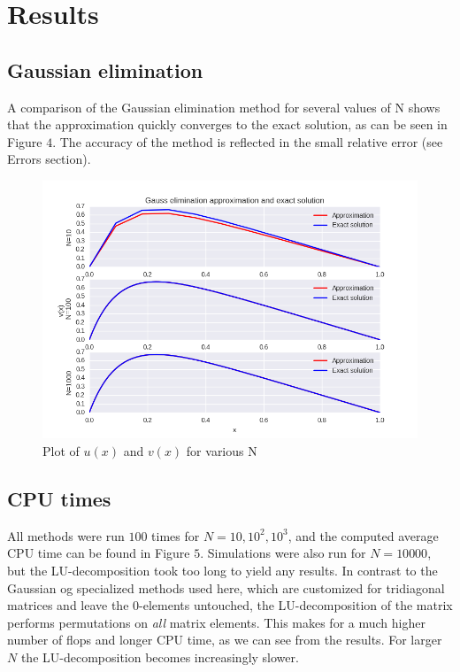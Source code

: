 \documentclass[11pt]{article}
\begin{document}
\pagebreak

\section*{Results}

\subsection*{Gaussian elimination}

\begin{flushleft}
A comparison of the Gaussian elimination method for several values of N shows that the approximation quickly converges to the exact solution, as can be seen in Figure $4$. The accuracy of the method is reflected in the small relative error (see Errors section).

\begin{figure}[ht]\label{Gauss plot for N=10,100,1000}
\includegraphics[scale=0.8]{Gaussian_comparison.png}
\caption{Plot of $u(x)$ and $v(x)$ for various N}
\end{figure}

\end{flushleft}

\subsection*{CPU times}

\begin{flushleft}
All methods were run $100$ times for $N=10, 10^2, 10^3$, and the computed average CPU time can be found in Figure $5$. Simulations were also run for $N=10 000$, but the LU-decomposition took too long to yield any results. In contrast to the Gaussian og specialized methods used here, which are customized for tridiagonal matrices and leave the $0$-elements untouched, the LU-decomposition of the matrix performs permutations on \textit{all} matrix elements. This makes for a much higher number of flops and longer CPU time, as we can see from the results. For larger $N$ the LU-decomposition becomes increasingly slower.
\end{flushleft}
\end{document}
